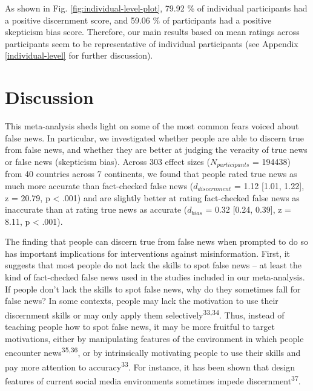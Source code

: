 \documentclass[
  man]{apa6}
\begin{document}
As shown in Fig. \ref{fig:individual-level-plot}, 79.92 \% of individual participants had a positive discernment score, and 59.06 \% of participants had a positive skepticism bias score. Therefore, our main results based on mean ratings across participants seem to be representative of individual participants (see Appendix \ref{individual-level} for further discussion).

\section{Discussion}\label{discussion}

This meta-analysis sheds light on some of the most common fears voiced about false news. In particular, we investigated whether people are able to discern true from false news, and whether they are better at judging the veracity of true news or false news (skepticism bias). Across 303 effect sizes (\(N_{participants}\) = 194438) from 40 countries across 7 continents, we found that people rated true news as much more accurate than fact-checked false news (\(d_{discernment}\) = 1.12 {[}1.01, 1.22{]}, z = 20.79, p \textless{} .001) and are slightly better at rating fact-checked false news as inaccurate than at rating true news as accurate (\(d_{bias}\) = 0.32 {[}0.24, 0.39{]}, z = 8.11, p \textless{} .001).

The finding that people can discern true from false news when prompted to do so has important implications for interventions against misinformation. First, it suggests that most people do not lack the skills to spot false news -- at least the kind of fact-checked false news used in the studies included in our meta-analysis. If people don't lack the skills to spot false news, why do they sometimes fall for false news? In some contexts, people may lack the motivation to use their discernment skills or may only apply them selectively\textsuperscript{33,34}. Thus, instead of teaching people how to spot false news, it may be more fruitful to target motivations, either by manipulating features of the environment in which people encounter news\textsuperscript{35,36}, or by intrinsically motivating people to use their skills and pay more attention to accuracy\textsuperscript{33}. For instance, it has been shown that design features of current social media environments sometimes impede discernment\textsuperscript{37}.
\end{document}
